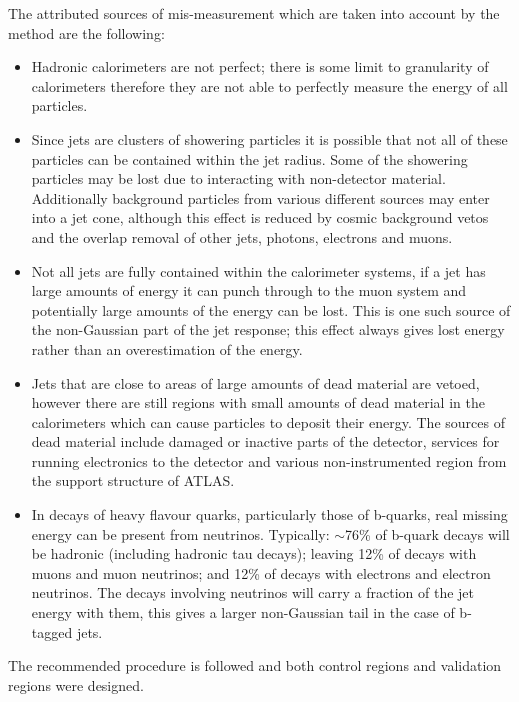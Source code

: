 The attributed sources of mis-measurement which are taken into account by the method are the following:
\begin{itemize}
\item Hadronic calorimeters are not perfect; there is some limit to granularity of calorimeters therefore they are not able to perfectly measure the energy of all particles.
\item Since jets are clusters of showering particles it is possible that not all of these particles can be contained within the jet radius. Some of the showering particles may be lost due to interacting with non-detector material. Additionally background particles from various different sources may enter into a jet cone, although this effect is reduced by cosmic background vetos and the overlap removal of other jets, photons, electrons and muons.
\item Not all jets are fully contained within the calorimeter systems, if a jet has large amounts of energy it can punch through to the muon system and potentially large amounts of the energy can be lost. This is one such source of the non-Gaussian part of the jet response; this effect always gives lost energy rather than an overestimation of the energy.
\item Jets that are close to areas of large amounts of dead material are vetoed, however there are still regions with small amounts of dead material in the calorimeters which can cause particles to deposit their energy. The sources of dead material include damaged or inactive parts of the detector, services for running electronics to the detector and various non-instrumented region from the support structure of ATLAS.
\item In decays of heavy flavour quarks, particularly those of b-quarks, real missing energy can be present from neutrinos. Typically: $\sim$76\% of b-quark decays will be hadronic (including hadronic tau decays); leaving 12\% of decays with muons and muon neutrinos; and 12\% of decays with electrons and electron neutrinos. The decays involving neutrinos will carry a fraction of the jet energy with them, this gives a larger non-Gaussian tail in the case of b-tagged jets.
\end{itemize}

The recommended procedure is followed and both control regions and validation regions were designed. \\

